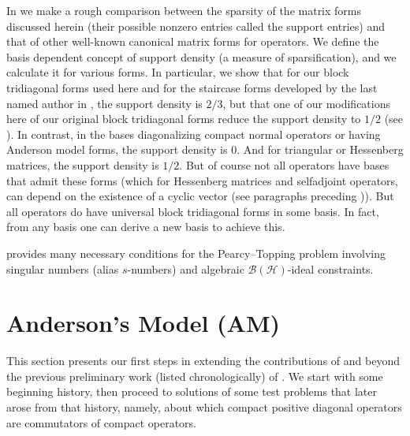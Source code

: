 \documentclass[10pt,reqno]{amsart}
\theoremstyle{remark}
\newcommand{\BH}{\mathcal{B}(\Hil)}
\newcommand{\Hil}{\mathcal{H}}
\numberwithin{equation}{section}
\begin{document}
In  we make a rough comparison between the sparsity of the matrix forms discussed herein (their possible nonzero entries called the support entries) and that of other well-known canonical matrix forms for operators.
We define the basis dependent concept of support density (a measure of sparsification), and we calculate it for various forms.
In particular, we show that for our block tridiagonal forms used here and for the staircase forms developed by the last named author in \cite{Wei-1980-IEOT}, the support density is $2/3$, but that one of our modifications here of our original block tridiagonal forms reduce the support density to $1/2$ (see ).
In contrast, in the bases diagonalizing compact normal operators or having Anderson model forms, the support density is $0$.
And for triangular or Hessenberg matrices, the support density is $1/2$.
But of course not all operators have bases that admit these forms (which for Hessenberg matrices and selfadjoint operators, can depend on the existence of a cyclic vector (see paragraphs preceding )).
But all operators do have universal block tridiagonal forms in some basis.
In fact, from any basis one can derive a new basis to achieve this.

 provides many necessary conditions for the Pearcy--Topping problem involving singular numbers (alias $s$-numbers) and algebraic $\BH$-ideal constraints.
 




\section{Anderson's Model (AM)}
\label{sec3}

This section presents our first steps in extending the contributions of \cite{And-1977-JRAM} and \cite{Wei-1980-IEOT} beyond the previous preliminary work (listed chronologically) of \cite{DMR,Pat-2012,BPW-2014-VLOT}.
We start with some beginning history, then proceed to solutions of some test problems that later arose from that history, namely, about which compact positive diagonal operators are commutators of compact operators.
\end{document}
